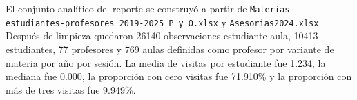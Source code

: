 El conjunto analítico del reporte se construyó a partir de \texttt{Materias estudiantes-profesores 2019-2025 P y O.xlsx} y \texttt{Asesorias2024.xlsx}. Después de limpieza quedaron 26140 observaciones estudiante-aula, 10413 estudiantes, 77 profesores y 769 aulas definidas como profesor por variante de materia por año por sesión. La media de visitas por estudiante fue 1.234, la mediana fue 0.000, la proporción con cero visitas fue 71.910\% y la proporción con más de tres visitas fue 9.949\%.
